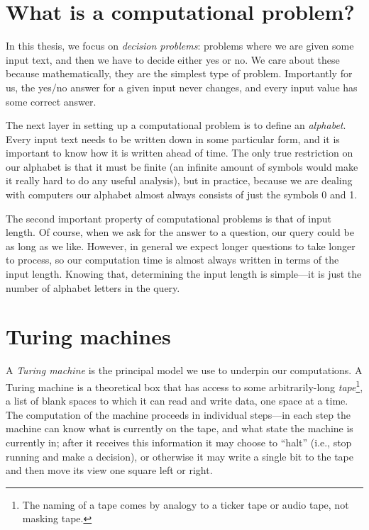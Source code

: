 \documentclass[english,12pt]{reedthesis}
\theoremstyle{plain}
\theoremstyle{definition}
\theoremstyle{remark}
\begin{document}
\section{What is a computational problem?}

In this thesis, we focus on \emph{decision problems}: problems where we are
given some input text, and then we have to decide either yes or no. We care
about these because mathematically, they are the simplest type of problem.
Importantly for us, the yes/no answer for a given input never changes, and every
input value has some correct answer.

The next layer in setting up a computational problem is to define an
\emph{alphabet}. Every input text needs to be written down in some particular
form, and it is important to know how it is written ahead of time. The only true
restriction on our alphabet is that it must be finite (an infinite amount of
symbols would make it really hard to do any useful analysis), but in practice,
because we are dealing with computers our alphabet almost always consists of
just the symbols 0 and 1.

The second important property of computational problems is that of input length.
Of course, when we ask for the answer to a question, our query could be as long
as we like. However, in general we expect longer questions to take longer to
process, so our computation time is almost always written in terms of the input
length. Knowing that, determining the input length is simple---it is just the
number of alphabet letters in the query.

\section{Turing machines}

A \emph{Turing machine} is the principal model we use to underpin our
computations. A Turing machine is a theoretical box that has access to some
arbitrarily-long \emph{tape}\footnote{The naming of a tape comes by analogy to a
  ticker tape or audio tape, not masking tape.}, a list of blank spaces to which
it can read and write data, one space at a time. The computation of the machine
proceeds in individual steps---in each step the machine can know what is currently
on the tape, and what state the machine is currently in; after it receives this
information it may choose to ``halt'' (i.e., stop running and make a decision),
or otherwise it may write a single bit to the tape and then move its view one
square left or right.
\end{document}
